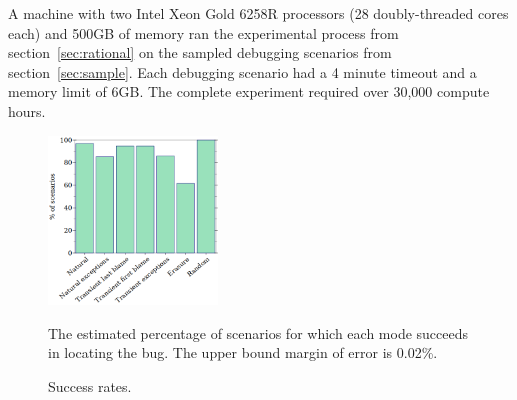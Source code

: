 
A machine with two Intel Xeon Gold 6258R processors (28 doubly-threaded cores each)
and 500GB of memory ran the experimental process from section~\ref{sec:rational} on the
sampled debugging scenarios from section~\ref{sec:sample}.  Each debugging scenario had a 4 minute timeout and a
memory limit of 6GB. The complete experiment required over 30,000 compute
hours.


\begin{figure}
  \includegraphics[width=0.40\textwidth]{./plots/success-bars}

  \vspace{1em}
  \begin{minipage}{0.4\textwidth}
  The estimated percentage of scenarios for which each mode succeeds in locating the bug.
  The upper bound margin of error is 0.02\%.
  \end{minipage}

  \caption{Success rates.}
  \label{fig:success-bars}
\end{figure}


